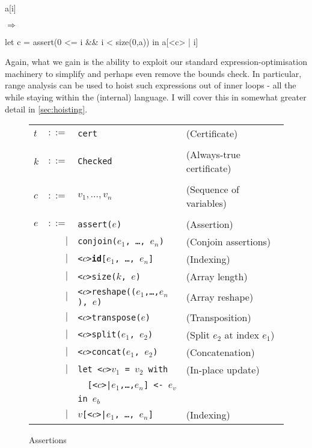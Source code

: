 \begin{minipage}{0.1\columnwidth}
\begin{center}
\begin{colorcode}
a[i]
\end{colorcode}
\end{center}
\end{minipage}
$\Rightarrow$
\begin{minipage}{0.46\columnwidth}
\begin{center}
\begin{colorcode}
let c = assert(0 <= i && i < size(0,a)) in
a[<c> | i]
\end{colorcode}
\end{center}
\end{minipage}

Again, what we gain is the ability to exploit our standard
expression-optimisation machinery to simplify and perhaps even remove
the bounds check.  In particular, range analysis can be used to hoist
such expressions out of inner loops - all the while staying within the
(internal) \LO{} language.  I will cover this in somewhat greater
detail in \cref{sec:hoisting}.

\begin{figure}[bt]
\begin{tabular}{lrll}
$t$ & $::=$ & \texttt{cert} & (Certificate) \\
\\
$k$ & $::=$ & \texttt{Checked} & (Always-true certificate) \\
\\
$c$ & $::=$ & $v_1, \ldots ,v_{n}$ & (Sequence of variables) \\
\\
$e$ & $::=$ & \texttt{assert($e$)} & (Assertion) \\
& $|$ & \texttt{conjoin($e_{1}$, \ldots, $e_{n}$)} & (Conjoin assertions) \\
& $|$ & \texttt{<$c$>\textbf{id}[$e_{1}$, \ldots, $e_{n}$]} & (Indexing) \\
& $|$ & \texttt{<$c$>size($k$, $e$)} & (Array length) \\
& $|$ & \texttt{<$c$>reshape(($e_{1}$,\ldots,$e_{n}$), $e$)} & (Array reshape) \\
& $|$ & \texttt{<$c$>transpose($e$)} & (Transposition) \\
& $|$ & \texttt{<$c$>split($e_{1}$, $e_{2}$)} & (Split $e_{2}$ at index $e_{1}$) \\
& $|$ & \texttt{<$c$>concat($e_{1}$, $e_{2}$)} & (Concatenation) \\
& $|$ & \texttt{let <$c$>$v_{1}$ = $v_{2}$ with} & (In-place update) \\
&     & \texttt{\ \ [<$c$>|$e_{1}$,\ldots,$e_{n}$] <- $e_{v}$} \\
&     & \texttt{in $e_{b}$} \\
& $|$ & \texttt{$v$[<$c$>|$e_{1}$, \ldots, $e_{n}$]} & (Indexing) \\
\end{tabular}
\caption{Assertions}
\label{fig:assertions}
\end{figure}

